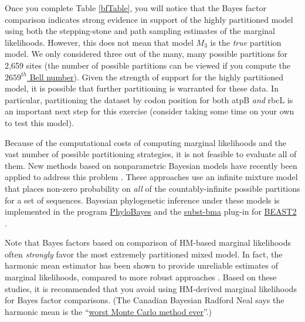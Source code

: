 Once you complete Table \ref{bfTable}, you will notice that the Bayes factor comparison indicates strong evidence in support of the highly partitioned model using both the stepping-stone and path sampling estimates of the marginal likelihoods. 
However, this does not mean that model $M_3$ is the \textit{true} partition model.
We only considered three out of the many, many possible partitions for 2,659 sites (the number of possible partitions can be viewed if you compute the \href{http://www.wolframalpha.com/input/?i=bell+number(2659)}{$2659^{th}$ Bell number}). 
Given the strength of support for the highly partitioned model, it is possible that further partitioning is warranted for these data. 
In particular, partitioning the dataset by codon position for both atpB \textit{and} rbcL is an important next step for this exercise (consider taking some time on your own to test this model). 

Because of the computational costs of computing marginal likelihoods and the vast number of possible partitioning strategies, it is not feasible to evaluate all of them. 
New methods based on nonparametric Bayesian models have recently been applied to address this problem \citep{lartillot04,huelsenbeck07b,wuCH2013}. 
These approaches use an infinite mixture model \citep[the Dirichlet process;][]{ferguson73,antoniak74} that places non-zero probability on \textit{all} of the countably-infinite possible partitions for a set of sequences. 
Bayesian phylogenetic inference under these models is implemented in the program \href{http://megasun.bch.umontreal.ca/People/lartillot/www/index.htm}{PhyloBayes} \citep{Lartillot2009} and the \href{https://code.google.com/p/subst-bma/}{subst-bma} plug-in for \href{http://beast2.cs.auckland.ac.nz/index.php/Main_Page}{BEAST2} \citep{wuCH2013}.




Note that Bayes factors based on comparison of HM-based marginal likelihoods 
often \textit{strongly} favor the most extremely partitioned mixed model. 
In fact, the harmonic mean estimator has been shown to provide unreliable estimates of marginal likelihoods, compared to more robust approaches \citep{lartillot06,xie11,fan11}.
Based on these studies, it is recommended that you avoid %
using HM-derived marginal likelihoods for Bayes factor comparisons.
(The Canadian Bayesian Radford Neal says the harmonic mean is the ``\href{http://radfordneal.wordpress.com/2008/08/17/the-harmonic-mean-of-the-likelihood-worst-monte-carlo-method-ever/}{worst Monte Carlo method ever}''.)



